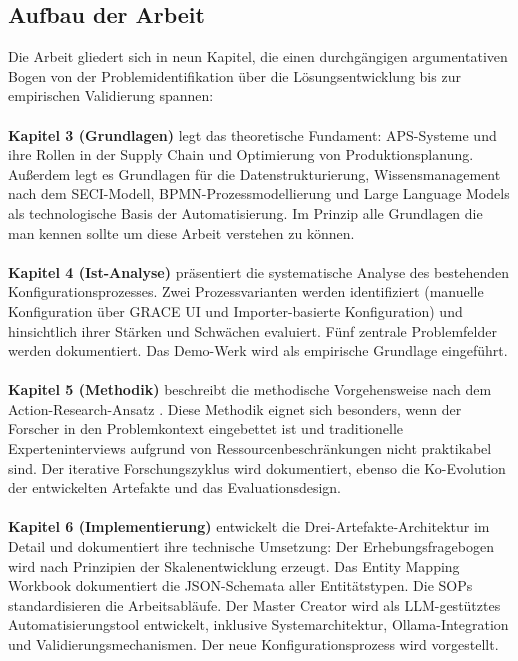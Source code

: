 \subsection{Aufbau der Arbeit}
\label{subsec:Aufbau}

Die Arbeit gliedert sich in neun Kapitel, die einen durchgängigen argumentativen Bogen von der Problemidentifikation über die Lösungsentwicklung bis zur empirischen Validierung spannen:
\\\\
\textbf{Kapitel 3 (Grundlagen)} legt das theoretische Fundament: APS-Systeme und ihre Rollen in der Supply Chain und Optimierung von Produktionsplanung. Außerdem legt es Grundlagen für die Datenstrukturierung, Wissensmanagement nach dem SECI-Modell, BPMN-Prozessmodellierung und Large Language Models als technologische Basis der Automatisierung. Im Prinzip alle Grundlagen die man kennen sollte um diese Arbeit verstehen zu können.
\\\\
\textbf{Kapitel 4 (Ist-Analyse)} präsentiert die systematische Analyse des bestehenden Konfigurationsprozesses. Zwei Prozessvarianten werden identifiziert (manuelle Konfiguration über GRACE UI und Importer-basierte Konfiguration) und hinsichtlich ihrer Stärken und Schwächen evaluiert. Fünf zentrale Problemfelder werden dokumentiert. Das Demo-Werk wird als empirische Grundlage eingeführt.
\\\\
\textbf{Kapitel 5 (Methodik)} beschreibt die methodische Vorgehensweise nach dem Action-Research-Ansatz \citep{lewin:action_research1946}. Diese Methodik eignet sich besonders, wenn der Forscher in den Problemkontext eingebettet ist und traditionelle Experteninterviews aufgrund von Ressourcenbeschränkungen nicht praktikabel sind. Der iterative Forschungszyklus wird dokumentiert, ebenso die Ko-Evolution der entwickelten Artefakte und das Evaluationsdesign.
\\\\
\textbf{Kapitel 6 (Implementierung)} entwickelt die Drei-Artefakte-Architektur im Detail und dokumentiert ihre technische Umsetzung: Der Erhebungsfragebogen wird nach Prinzipien der Skalenentwicklung \citep{devellis:scale_development2017} erzeugt. Das Entity Mapping Workbook dokumentiert die JSON-Schemata aller Entitätstypen. Die SOPs standardisieren die Arbeitsabläufe. Der Master Creator wird als LLM-gestütztes Automatisierungstool entwickelt, inklusive Systemarchitektur, Ollama-Integration und Validierungsmechanismen. Der neue Konfigurationsprozess wird vorgestellt.
